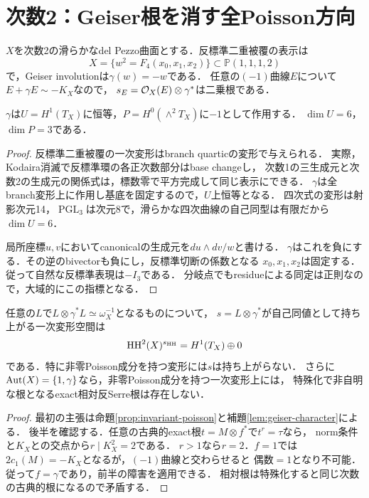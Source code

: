 \section{次数2：Geiser根を消す全Poisson方向}
\label{sec:degree2}
$X$を次数2の滑らかなdel Pezzo曲面とする．反標準二重被覆の表示は
\[
 X=\{w^2=F_4(x_0,x_1,x_2)\}\subset\mathbb P(1,1,1,2)
\]
で，Geiser involutionは$\gamma(w)=-w$である\cite[\S2.3, \S4]{DM}．
任意の$(-1)$曲線$E$について$E+\gamma E\sim-K_X$なので，
$s_E=\mathcal O_X(E)\otimes\gamma^*$は二乗根である\cite{Index}．

\begin{lemma}[自然な反標準表現]\label{lem:geiser-character}
$\gamma$は$U=H^1(T_X)$に恒等，$P=H^0(\wedge^2T_X)$に$-1$として作用する．
$\dim U=6$，$\dim P=3$である．
\end{lemma}
\begin{proof}
反標準二重被覆の一次変形はbranch quarticの変形で与えられる．
実際，Kodaira消滅で反標準環の各正次数部分はbase changeし，
次数1の三生成元と次数2の生成元の関係式は，標数零で平方完成して同じ表示にできる．
$\gamma$は全branch変形上に作用し基底を固定するので，$U$上恒等となる．
四次式の変形は射影次元14，$\operatorname{PGL}_3$は次元8で，滑らかな四次曲線の自己同型は有限だから$\dim U=6$．

局所座標$u,v$においてcanonicalの生成元を$du\wedge dv/w$と書ける．
$\gamma$はこれを負にする．その逆のbivectorも負にし，反標準切断の係数となる
$x_0,x_1,x_2$は固定する．従って自然な反標準表現は$-I_3$である．
分岐点でもresidueによる同定は正則なので，大域的にこの指標となる．
\end{proof}

\begin{theorem}[Geiser根の一次持上げ障害]\label{thm:geiser}
任意の$L$で$L\otimes\gamma^*L\simeq\omega_X^{-1}$となるものについて，
$s=L\otimes\gamma^*$が自己同値として持ち上がる一次変形空間は
\[
 \operatorname{HH}^2(X)^{s_{\operatorname{HH}}}=H^1(T_X)\oplus0
\]
である．特に非零Poisson成分を持つ変形には$s$は持ち上がらない．
さらに$\operatorname{Aut}(X)=\{1,\gamma\}$なら，非零Poisson成分を持つ一次変形上には，
特殊化で非自明な根となるexact相対反Serre根は存在しない．
\end{theorem}
\begin{proof}
最初の主張は命題\ref{prop:invariant-poisson}と補題\ref{lem:geiser-character}による．
後半を確認する．任意の古典的exact根$t=M\otimes f^*$で$t^r=\tau$なら，
norm条件と$K_X$との交点から$r\mid K_X^2=2$である．
$r>1$なら$r=2$．$f=1$では$2c_1(M)=-K_X$となるが，$(-1)$曲線と交わらせると
偶数$=1$となり不可能．従って$f=\gamma$であり，前半の障害を適用できる．
相対根は特殊化すると同じ次数の古典的根になるので矛盾する．
\end{proof}

